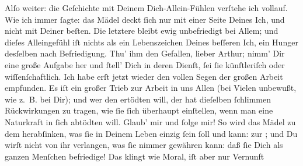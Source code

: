 \pstart
           Alſo weiter: die Geſchichte mit Deinem Dich-Allein-Fühlen verſtehe ich vollauf. Wie
               ich immer ſagte: das Mädel deckt ſich nur mit einer Seite Deines Ich, und nicht
               mit Deiner beſten. Die letztere bleibt ewig unbefriedigt bei Allem; und dieſes
               Alleingefühl iſt nichts als ein Lebenszeichen Deines beſſeren Ich, ein Hunger
               desſelben nach Befriedigung. Thu’ ihm den Gefallen, lieber Arthur; nimm’ Dir eine
               große Aufgabe her und ſtell’ Dich in deren Dienſt, ſei ſie künſtleriſch oder
               wiſſenſchaftlich. Ich habe erſt jetzt wieder den vollen Segen der großen Arbeit
               empfunden. Es iſt ein großer Trieb zur {\pb}Arbeit in
               uns Allen (bei Vielen unbewußt, wie z. B. bei Dir); und wer den  ertödten will, der hat dieſelben ſchlimmen
               Rückwirkungen zu tragen, wie ſie ſich überhaupt einſtellen, wenn man eine Naturkraft
               in ſich abtödten will. Glaub’ mir und ſolge mir! So wird das Mädel zu dem herabſinken, was
               ſie in Deinem Leben einzig ſein ſoll und kann: zur \label{K_L02661-2v}\label{K_L02661-2}; und Du wirſt nicht von ihr verlangen, was
               ſie nimmer gewähren kann: daß ſie Dich als ganzen Menſchen befriedige! Das klingt wie
               Moral, iſt aber nur Vernunft{\dotsfive}\pend
           
